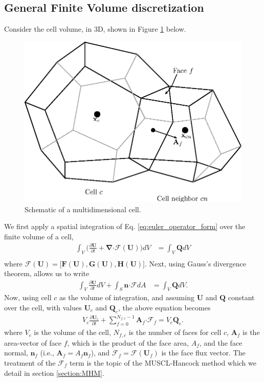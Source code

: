 \documentclass[10pt,letterpaper,notitlepage]{article}
\numberwithin{equation}{section}
\newcommand{\partialderiv}[2]{\frac{\partial #1}{\partial #2}}
\newcommand{\bnabla}{\boldsymbol{\nabla}}
\newcommand{\dotp}{\boldsymbol{\cdot}}
\newcommand{\beqn}{\begin{equation}\begin{aligned}}
\newcommand{\eeqn}{\end{aligned}\end{equation}}
\begin{document}
\vspace{1cm}
\subsection{General Finite Volume discretization}
Consider the cell volume, in 3D, shown in Figure \ref{fig:faceorientation} below.
\begin{figure}[H]
\centering
\includegraphics[width=0.5\linewidth]{figures/FaceOrientation}
\caption{Schematic of a multidimensional cell.}
\label{fig:faceorientation}
\end{figure}

\noindent
We first apply a spatial integration of Eq. \eqref{eq:euler_operator_form} over the finite volume of a cell,
\beqn 
\int_V \biggr( 
\partialderiv{\mathbf{U}}{t} + 
\bnabla \dotp \mathcal{F}(\mathbf{U})
\biggr) dV &= 
\int_V \mathbf{Q} dV \\
\eeqn 
where $\mathcal{F} (\mathbf{U}) = \big[
\mathbf{F}(\mathbf{U}),
\mathbf{G}(\mathbf{U}), 
\mathbf{H}(\mathbf{U})
\big]$. Next, using Gauss's divergence theorem, allows us to write
\beqn
\int_V \partialderiv{\mathbf{U}}{t}  dV 
+ 
\int_S \mathbf{n} \dotp \mathcal{F}  dA &= 
\int_V \mathbf{Q} dV .
\eeqn 
Now, using cell $c$ as the volume of integration, and assuming $\mathbf{U}$ and $\mathbf{Q}$ constant over the cell, with values $\mathbf{U}_c$ and $\mathbf{Q}_c$, the above equation becomes
\beqn \label{eq:general_finite_volume}
V_c \partialderiv{\mathbf{U}_c}{t} 
+ 
\sum_{f=0}^{N_{f,c}{-}1} 
\mathbf{A}_f \dotp \mathcal{F}_f
= 
V_c \mathbf{Q}_c.
\eeqn 
where $V_c$ is the volume of the cell, $N_{f,c}$ is the number of faces for cell $c$, $\mathbf{A}_f$ is the area-vector of face $f$, which is the product of the face area, $A_f$, and the face normal, $\mathbf{n}_f$ (i.e., $\mathbf{A}_f = A_f \mathbf{n}_f$), and $\mathcal{F}_f = \mathcal{F}(\mathbf{U}_f)$ is the face flux vector.  The treatment of the $\mathcal{F}_f$ term is the topic of the MUSCL-Hancock method which we detail in section \ref{section:MHM}.
\end{document}
